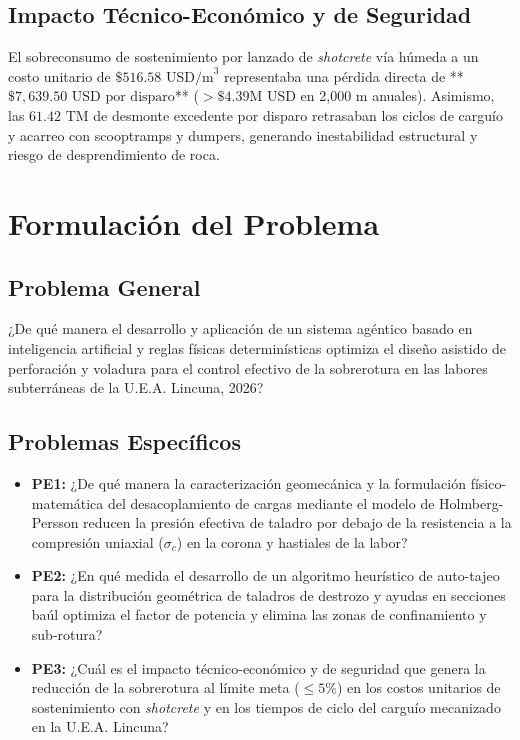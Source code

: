 \documentclass[12pt,a4paper,oneside]{book}
\begin{document}
\subsection{Impacto Técnico-Económico y de Seguridad}
El sobreconsumo de sostenimiento por lanzado de \textit{shotcrete} vía húmeda a un costo unitario de $\$516.58\text{ USD/m}^3$ representaba una pérdida directa de **$\$7,639.50\text{ USD por disparo}$** ($>\$4.39\text{M USD}$ en 2,000 m anuales). Asimismo, las $61.42\text{ TM}$ de desmonte excedente por disparo retrasaban los ciclos de carguío y acarreo con scooptramps y dumpers, generando inestabilidad estructural y riesgo de desprendimiento de roca.

\section{Formulación del Problema}
\subsection{Problema General}
¿De qué manera el desarrollo y aplicación de un sistema agéntico basado en inteligencia artificial y reglas físicas determinísticas optimiza el diseño asistido de perforación y voladura para el control efectivo de la sobrerotura en las labores subterráneas de la U.E.A. Lincuna, 2026?

\subsection{Problemas Específicos}
\begin{itemize}
    \item \textbf{PE1:} ¿De qué manera la caracterización geomecánica y la formulación físico-matemática del desacoplamiento de cargas mediante el modelo de Holmberg-Persson reducen la presión efectiva de taladro por debajo de la resistencia a la compresión uniaxial ($\sigma_c$) en la corona y hastiales de la labor?
    \item \textbf{PE2:} ¿En qué medida el desarrollo de un algoritmo heurístico de auto-tajeo para la distribución geométrica de taladros de destrozo y ayudas en secciones baúl optimiza el factor de potencia y elimina las zonas de confinamiento y sub-rotura?
    \item \textbf{PE3:} ¿Cuál es el impacto técnico-económico y de seguridad que genera la reducción de la sobrerotura al límite meta ($\le 5\%$) en los costos unitarios de sostenimiento con \textit{shotcrete} y en los tiempos de ciclo del carguío mecanizado en la U.E.A. Lincuna?
\end{itemize}
\end{document}
